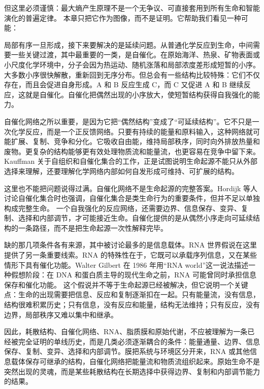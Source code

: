 但这里必须谨慎：最大熵产生原理不是一个无争议、可直接套用到所有生命和智能演化的普遍定律。\cite{bruers2007} 本章只把它作为图像，而不是证明。它帮助我们看见一种可能：


局部有序一旦形成，接下来要解决的是延续问题。从普通化学反应到生命，中间需要一些关键过渡，其中最重要的一类，是自催化。在原始海洋、热泉、矿物表面或小尺度化学环境中，分子会因为热运动、随机涨落和局部浓度差形成短暂的小序。大多数小序很快解散，重新回到无序分布。但总会有一些结构比较特殊：它们不仅存在，而且会促进自身形成。A 和 B 反应生成 C，而 C 又促进 A 和 B 继续反应，这就是自催化。自催化把偶然出现的小序放大，使短暂结构获得自我强化的能力。

自催化网络之所以重要，是因为它把“偶然结构”变成了“可延续结构”。它不只是一次化学反应，而是一个正反馈网络。只要有持续的能量和原料输入，这种网络就可能扩展、复制、竞争和分化。它吸收自由能，维持局部秩序，同时向外排放热量和废物。更复杂的结构能够更有效处理物质流和能量流，也更容易在竞争中留下来。Kauffman 关于自组织和自催化集合的工作，正是试图说明生命起源不能只从外部选择来理解，还要理解化学网络内部如何自发形成可维持、可扩展的结构。\cite{kauffman1993}

这里也不能把问题说得过满。自催化网络不是生命起源的完整答案。Hordijk 等人讨论自催化集合时也强调，自催化集合是类生命行为的重要条件，但并不足以单独构成完整生命。\cite{hordijk2018} 一个自我强化的反应网络，还需要边界、信息保存、变异、复制、选择和内部调节，才可能接近生命。自催化提供的是从偶然小序走向可延续结构的一条路径，而不是把生命起源一次性解释完毕。

缺的那几项条件各有来源，其中被讨论最多的是信息载体。RNA 世界假说在这里提供了另一条重要线索。RNA 的特殊性在于，它既可以承载序列信息，又在某些情形下具有催化功能。Walter Gilbert 在 1986 年用“RNA world”这一说法描述一种假想阶段：在 DNA 和蛋白质主导的现代生命之前，RNA 可能曾同时承担信息保存和催化功能。\cite{gilbert1986} 这个假说并不等于生命起源已经被解决，但它说明一个关键点：生命的出现需要把信息、反应和复制逐渐扣在一起。只有能量流，没有信息，结构很难积累历史；只有信息，没有反应和能量，结构无法维持；只有反应，没有边界，局部秩序又难以集中和继承。

因此，耗散结构、自催化网络、RNA、脂质膜和原始代谢，不应被理解为一条已经被完全证明的单线历史，而是几类必须逐渐耦合的条件：能量通量、边界、信息保存、复制、变异、选择和内部调节。膜把系统与环境区分开来，RNA 或其他信息载体保存可继承的结构，自催化网络把能量流和物质流组织起来。原始生命不是突然出现的灵魂，而是某些耗散结构在长期选择中获得边界、复制和内部调节能力的结果。

